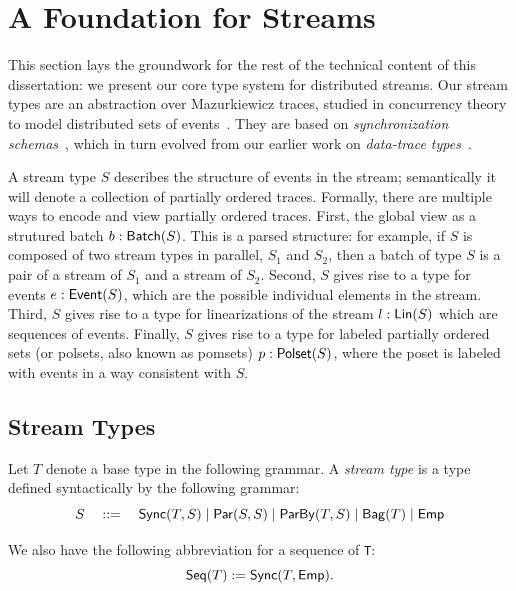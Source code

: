 \chapter{A Foundation for Streams}
\label{cha:foundation}

This section lays the groundwork for the rest of the technical content of this dissertation: we present our core type system for distributed streams.
Our stream types are an abstraction over Mazurkiewicz traces, studied in concurrency theory to model distributed sets of events~\cite{mazurkiewicz1986trace,DiekertR1995}.
They are based on \emph{synchronization schemas}~, which in turn evolved from our earlier work on \emph{data-trace types}~.

A stream type $S$ describes the structure of events in the stream;
semantically it will denote a collection of partially ordered traces.
Formally, there are multiple ways to encode and view partially ordered traces.
First, the global view as a strutured batch $b: \mathsf{Batch}({S})$.
This is a parsed structure: for example, if $S$ is composed of two stream types in parallel, $S_1$ and $S_2$, then a batch of type $S$ is a pair of a stream of $S_1$ and a stream of $S_2$.
Second, $S$ gives rise to a type for events $e: \mathsf{Event}({S})$,
which are the possible individual elements in the stream.
Third, $S$ gives rise to a type for linearizations of the stream $l: \mathsf{Lin}({S})$
which are sequences of events.
Finally, $S$ gives rise to a type for labeled partially ordered sets (or polsets, also known as pomsets)
$p: \mathsf{Polset}({S})$, where the poset is labeled with events in a way consistent with $S$.

\section{Stream Types}

\begin{definition}
Let $T$ denote a base type in the following grammar.
A \emph{stream type} is a type defined syntactically by the following grammar:
\[
  S \quad ::= \quad
    \mathsf{Sync}({T}, S) \mid
    \mathsf{Par}({S}, {S}) \mid
    \mathsf{ParBy}({T}, S) \mid
    \mathsf{Bag}({T}) \mid
    \mathsf{Emp}{}
\]
\end{definition}

We also have the following abbreviation for a sequence of \texttt{T}:
\[
  \mathsf{Seq}({T}) := \mathsf{Sync}({T}, \mathsf{Emp}{}).
\]

